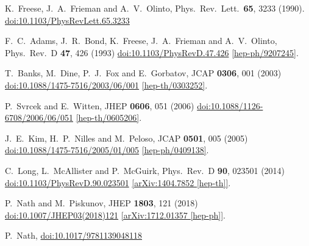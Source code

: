 \documentclass[12pt]{article}
\begin{document}
\begin{thebibliography}{99}
  K.~Freese, J.~A.~Frieman and A.~V.~Olinto,
  Phys.\ Rev.\ Lett.\  {\bf 65}, 3233 (1990).
  \href{https://dx.doi.org/10.1103/PhysRevLett.65.3233}{doi:10.1103/PhysRevLett.65.3233}

  F.~C.~Adams, J.~R.~Bond, K.~Freese, J.~A.~Frieman and A.~V.~Olinto,
  Phys.\ Rev.\ D {\bf 47}, 426 (1993)
  \href{https://dx.doi.org/10.1103/PhysRevD.47.426}{doi:10.1103/PhysRevD.47.426}
  \href{https://arxiv.org/abs/hep-ph/9207245}{[hep-ph/9207245]}.

  T.~Banks, M.~Dine, P.~J.~Fox and E.~Gorbatov,
  JCAP {\bf 0306}, 001 (2003)
  \href{https://dx.doi.org/10.1088/1475-7516/2003/06/001}{doi:10.1088/1475-7516/2003/06/001}
  \href{https://arxiv.org/abs/hep-th/0303252}{[hep-th/0303252]}.

  P.~Svrcek and E.~Witten,
  JHEP {\bf 0606}, 051 (2006)
  \href{https://dx.doi.org/10.1088/1126-6708/2006/06/051}{doi:10.1088/1126-6708/2006/06/051}
  \href{https://arxiv.org/abs/hep-th/0605206}{[hep-th/0605206]}.

  J.~E.~Kim, H.~P.~Nilles and M.~Peloso,
  JCAP {\bf 0501}, 005 (2005)
  \href{https://dx.doi.org/10.1088/1475-7516/2005/01/005}{doi:10.1088/1475-7516/2005/01/005}
  \href{https://arxiv.org/abs/hep-ph/0409138}{[hep-ph/0409138]}.

  C.~Long, L.~McAllister and P.~McGuirk,
  Phys.\ Rev.\ D {\bf 90}, 023501 (2014)
  \href{https://dx.doi.org/10.1103/PhysRevD.90.023501}{doi:10.1103/PhysRevD.90.023501}
  \href{https://arxiv.org/abs/1404.7852}{[arXiv:1404.7852 [hep-th]]}.

  P.~Nath and M.~Piskunov,
  JHEP {\bf 1803}, 121 (2018)
  \href{https://dx.doi.org/10.1007/JHEP03(2018)121}{doi:10.1007/JHEP03(2018)121}
  \href{https://arxiv.org/abs/1712.01357}{[arXiv:1712.01357 [hep-ph]]}.

  P.~Nath,
  \href{https://dx.doi.org/10.1017/9781139048118}{doi:10.1017/9781139048118}


\end{thebibliography}
\end{document}
